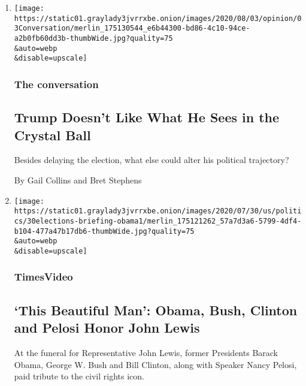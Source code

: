 \begin{enumerate}
\def\labelenumi{\arabic{enumi}.}
\item
  \href{/2020/08/03/opinion/trump-biden-2020.html}{}

  \texttt{[image: https://static01.graylady3jvrrxbe.onion/images/2020/08/03/opinion/03Conversation/merlin\_175130544\_e6b44300-bd86-4c10-94ce-a2b0fb60dd3b-thumbWide.jpg?quality=75\\\&auto=webp\\\&disable=upscale]}

  \hypertarget{the-conversation}{%
  \subsubsection{The conversation}\label{the-conversation}}

  \hypertarget{trump-doesnt-like-what-he-sees-in-the-crystal-ball}{%
  \subsection{Trump Doesn't Like What He Sees in the Crystal
  Ball}\label{trump-doesnt-like-what-he-sees-in-the-crystal-ball}}

  Besides delaying the election, what else could alter his political
  trajectory?

  By Gail Collins and Bret Stephens
\item
  \href{/video/us/politics/100000007264823/john-lewis-funeral.html}{}

  \texttt{[image: https://static01.graylady3jvrrxbe.onion/images/2020/07/30/us/politics/30elections-briefing-obama1/merlin\_175121262\_57a7d3a6-5799-4df4-b104-477a47b17db6-thumbWide.jpg?quality=75\\\&auto=webp\\\&disable=upscale]}

  \hypertarget{timesvideo}{%
  \subsubsection{TimesVideo}\label{timesvideo}}

  \hypertarget{this-beautiful-man-obama-bush-clinton-and-pelosi-honor-john-lewis}{%
  \subsection{`This Beautiful Man': Obama, Bush, Clinton and Pelosi
  Honor John
  Lewis}\label{this-beautiful-man-obama-bush-clinton-and-pelosi-honor-john-lewis}}

  At the funeral for Representative John Lewis, former Presidents Barack
  Obama, George W. Bush and Bill Clinton, along with Speaker Nancy
  Pelosi, paid tribute to the civil rights icon.


\end{enumerate}
